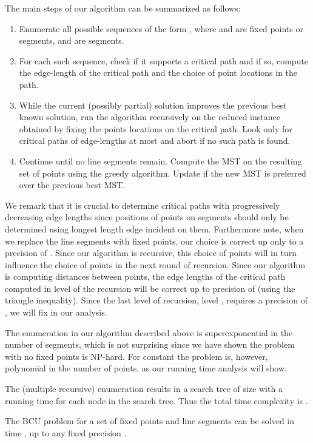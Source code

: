 The main steps of our algorithm can be summarized as follows:
\begin{enumerate}
\item
Enumerate all possible sequences of the form , where  and  are fixed points or segments, and  are segments.
\item
For each such sequence, check if it supports a critical path and if so, compute the edge-length  of the critical path and the choice of point locations in the path. 
\item
While the current (possibly partial) solution improves the previous best known solution, run the algorithm recursively on the reduced instance obtained by fixing the points locations 
on the critical path.  Look only for critical paths of edge-lengths at most  and abort if no such path is found. 
\item
Continue until no line segments remain. Compute the MST on the resulting set of points using the greedy algorithm.  Update if the new MST is preferred over the 
previous best MST.
\end{enumerate}



We remark that it is crucial to determine critical paths with progressively
decreasing edge lengths since positions of points on segments
should only be determined using longest length edge incident on them. Furthermore note, when we replace the line segments with fixed points, our choice is correct up only to a precision  of . Since our algorithm is recursive, this choice of points will in turn influence the choice of points in the next round of recursion. Since our algorithm is computing distances between points, the edge lengths of the critical path computed in level  of the recursion will be correct up to precision of  (using the triangle inequality). Since the last level of recursion, level , requires a precision of , we will fix  in our analysis.



The enumeration in our algorithm described above is superexponential in the number  of segments,
which is not surprising since we have shown the problem with no fixed points is
NP-hard.  For constant  the problem is, however, polynomial in the number  of points, as our running time analysis will show.

The (multiple recursive) enumeration results in a search tree of size   with a  running time for each node in the search tree. Thus the total time complexity is
.

\begin{theorem}
The BCU problem for a set of  fixed points and  line segments can be solved in time , up to any fixed precision .
\end{theorem}
 

